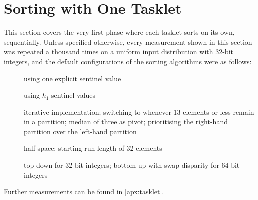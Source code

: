 \section{Sorting with One Tasklet}

This section covers the very first phase where each tasklet sorts on its own, \ie{} sequentially.
Unless specified otherwise, every measurement shown in this section was repeated a thousand times on a uniform input distribution with 32-bit integers, and the default configurations of the sorting algorithms were as follows:
\begin{description}
	\item[\IS{}]
	using one explicit sentinel value

	\item[\ShS{}]
	using \(h_1\) sentinel values

	\item[\QS{}]
	iterative implementation;
	switching to \IS{} whenever 13 elements or less remain in a partition;
	median of three as pivot;
	prioritising the right-hand partition over the left-hand partition

	\item[\MS{}]
	half space;
	starting run length of 32 elements

	\item[\HS{}]
	top-down for 32-bit integers;
	bottom-up with swap disparity for 64-bit integers
\end{description}
Further measurements can be found in \cref{apx:tasklet}.






